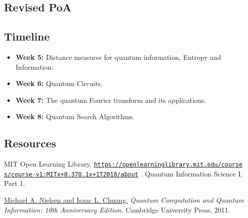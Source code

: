 \begin{center}
    \section*{Revised PoA}
\end{center}
\subsection*{Timeline}
\begin{itemize}
    \item \textbf{Week 5:} Distance measures for quantum information, Entropy and Information.
    \item \textbf{Week 6:} Quantum Circuits.
    \item \textbf{Week 7:} The quantum Fourier transform and its applications.
    \item \textbf{Week 8:} Quantum Search Algorithms.
\end{itemize}

\subsection*{Resources}
\begin{enumerate}[label={[\arabic*]}]
    \item MIT Open Learning Library. \href{https://openlearninglibrary.mit.edu/courses/course-v1:MITx+8.370.1x+1T2018/about}{\texttt{https://openlearninglibrary.mit.edu/course \\ s/course-v1:MITx+8.370.1x+1T2018/about}} . Quantum Information Science I, Part 1.
    \item \label{book:nielsen_chuang} \href{https://profmcruz.wordpress.com/wp-content/uploads/2017/08/quantum-computation-and-quantum-information-nielsen-chuang.pdf}{Michael A. Nielsen and Isaac L. Chuang.} \textit{Quantum Computation and Quantum Information: 10th Anniversary Edition}. Cambridge University Press, 2011.
\end{enumerate}